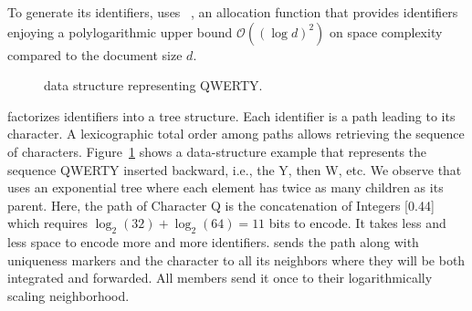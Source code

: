 

To generate its identifiers, \CRATE uses \LSEQ~\cite{nedelec2013lseq}, an
allocation function that provides identifiers enjoying a polylogarithmic upper
bound $\mathcal{O}((\log d)^2)$ on space complexity compared to the document
size $d$. 

\begin{figure}
  \centering
  
  \caption{\label{fig:lseqexample}\LSEQ data structure representing QWERTY.}
\end{figure}

\LSEQ factorizes identifiers into a tree structure. Each identifier is
a path leading to its character. A lexicographic total order among
paths allows retrieving the sequence of
characters. Figure~\ref{fig:lseqexample} shows a data-structure
example that represents the sequence QWERTY inserted backward, i.e.,
the Y, then W, etc. We observe that \LSEQ uses an exponential tree
where each element has twice as many children as its parent. Here, the
path of Character Q is the concatenation of Integers [0.44] which
requires $\log_2(32)+\log_2(64)=11$ bits to encode. It takes less and
less space to encode more and more identifiers. \CRATE sends the path
along with uniqueness markers and the character to all its neighbors
where they will be both integrated and forwarded. All members send it
once to their logarithmically scaling neighborhood.

